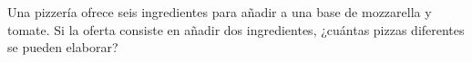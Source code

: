 Una pizzería ofrece seis ingredientes para añadir a una base de mozzarella y tomate. Si la oferta consiste en añadir dos ingredientes, ¿cuántas pizzas diferentes se pueden elaborar? 